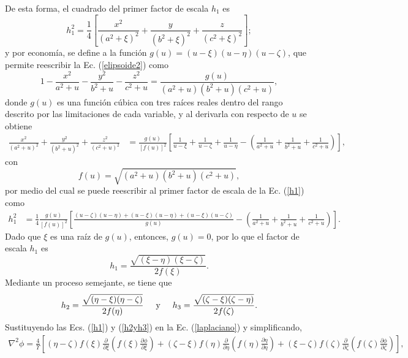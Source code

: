 De esta forma, el cuadrado del primer factor de escala $h_1$ es
\begin{equation}
	h_1^2=\frac{1}{4}\left[\frac{x^2}{(a^2+\xi)^2}+\frac{y}{(b^2+\xi)^2}+\frac{z}{(c^2+\xi)^2}\right];
	\label{h1}
\end{equation}
y por economía, se define a la función $g(u)=(u-\xi)(u-\eta)(u-\zeta)$, que permite reescribir la Ec. (\ref{elipsoide2}) como
\begin{equation}
	1-\frac{x^2}{a^2+u}-\frac{y^2}{b^2+u}-\frac{z^2}{c^2+u}=\frac{g(u)}{(a^2+u)(b^2+u)(c^2+u)},
\end{equation}
donde $g(u)$ es una función cúbica con tres raíces reales dentro del rango descrito por las limitaciones de cada variable, y al  derivarla con respecto de $u$ se obtiene
\begin{align}
	\frac{x^2}{(a^2+u)^2}+\frac{y^2}{(b^2+u)^2}+\frac{z^2}{(c^2+u)^2}&=\frac{g(u)}{[f(u)]^2}\left[\frac{1}{u-\xi}+\frac{1}{u-\zeta}+\frac{1}{u-\eta}-\left(\frac{1}{a^2+u}+\frac{1}{b^2+u}+\frac{1}{c^2+u}\right)\right],
\end{align}
con 
\begin{equation}
	f(u)=\sqrt{(a^2+u)(b^2+u)(c^2+u)},  
\end{equation}
por medio del cual se puede reescribir al primer factor de escala de la Ec. (\ref{h1}) como
\begin{align*}
	h_1^2&=\frac{1}{4}\frac{g(u)}{[f(u)]^2}\left[\frac{(u-\zeta)(u-\eta)+(u-\xi)(u-\eta)+(u-\xi)(u-\zeta)}{g(u)}-\left(\frac{1}{a^2+u}+\frac{1}{b^2+u}+\frac{1}{c^2+u}\right)\right].    
\end{align*}
Dado que $\xi$ es una raíz de $g(u)$, entonces, $g(u)=0$, por lo que el factor de escala $h_1$ es
\begin{equation}
	h_1=\frac{\sqrt{(\xi-\eta)(\xi-\zeta)}}{2f(\xi)}.
	\label{h1}
\end{equation}
Mediante un proceso semejante, se tiene que \cite{Arfken}
\begin{equation}
	h_2=\frac{\sqrt{(\eta-\xi)(\eta-\zeta)}}{2f(\eta)}\hspace{0.5cm}\mbox{y}\hspace{0.5cm}
	h_3=\frac{\sqrt{(\zeta-\xi)(\zeta-\eta)}}{2f(\zeta)}.
	\label{h2yh3}
\end{equation}
Sustituyendo las Ecs. (\ref{h1}) y (\ref{h2yh3}) en la Ec. (\ref{laplaciano}) y simplificando,
\begin{align*}
	\nabla^2\phi=\frac{4}{\Upsilon}\left[(\eta-\zeta)f(\xi)\frac{\partial}{\partial\xi}\left(f(\xi)\frac{\partial\phi}{\partial\xi}\right)+(\zeta-\xi)f(\eta)\frac{\partial}{\partial\eta}\left(f(\eta)\frac{\partial\eta}{\partial\eta}\right)+(\xi-\zeta)f(\zeta)\frac{\partial}{\partial\zeta}\left(f(\zeta)\frac{\partial\phi}{\partial\zeta}\right)\right],
\end{align*}
